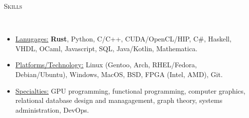\documentclass[9pt]{article}
\newenvironment{changemargin}[2]{%
  \begin{list}{}{%
    \setlength{\topsep}{0pt}%
    \setlength{\leftmargin}{#1}%
    \setlength{\rightmargin}{#2}%
    \setlength{\listparindent}{\parindent}%
    \setlength{\itemindent}{\parindent}%
    \setlength{\parsep}{\parskip}%
  }%
  \item[]}{\end{list}
}
\newcommand{\lineover}{
	\begin{changemargin}{-0.05in}{-0.05in}
		\vspace*{-8pt}
		\hrulefill \\
		\vspace*{-2pt}
	\end{changemargin}
}
\newcommand{\header}[1]{
	\begin{changemargin}{-0.5in}{-0.5in}
		\scshape{#1}\\
  	\lineover
	\end{changemargin}
}
\newenvironment{body} {
	\vspace*{-16pt}
	\begin{changemargin}{-0.25in}{-0.5in}
  }	
	{\end{changemargin}
}
\begin{document}
	\smallskip
	\vspace*{-3pt}



\smallskip

\header{Skills}
\smallskip
\begin{body}
	\vspace{14pt}
	\begin{itemize} \itemsep -0pt

		\item \uline{Lanugages:} \textbf{Rust}, Python, C/C++, CUDA/OpenCL/HIP, C\#, Haskell, VHDL, OCaml, Javascript, SQL, Java/Kotlin, Mathematica.

		\item \uline{Platforms/Technology:} Linux (Gentoo, Arch, RHEL/Fedora,
		Debian/Ubuntu), Windows, MacOS,
		      BSD, FPGA (Intel, AMD), Git.
		\item \uline{Specialties:} GPU programming, functional programming, computer graphics, relational database design and managagement, graph theory, systems administration, DevOps.
	\end{itemize}
\end{body}
\end{document}
